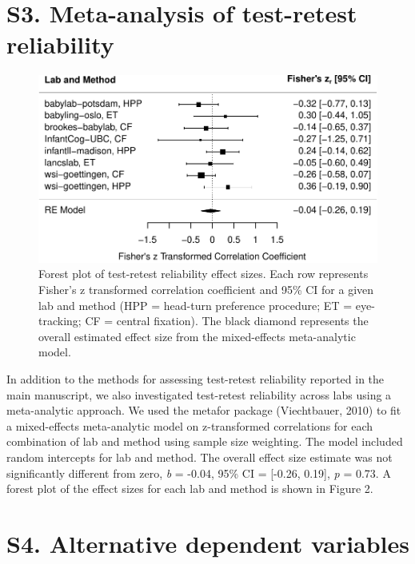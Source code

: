 \documentclass[
  man, donotrepeattitle,floatsintext]{apa6}
\begin{document}
\newpage

\hypertarget{s3.-meta-analysis-of-test-retest-reliability}{%
\section{S3. Meta-analysis of test-retest reliability}\label{s3.-meta-analysis-of-test-retest-reliability}}

\begin{figure}
\centering
\includegraphics{MB1T_supplement_files/figure-latex/fig2-1.pdf}
\caption{\label{fig:fig2}Forest plot of test-retest reliability effect sizes. Each row represents Fisher's z transformed correlation coefficient and 95\% CI for a given lab and method (HPP = head-turn preference procedure; ET = eye-tracking; CF = central fixation). The black diamond represents the overall estimated effect size from the mixed-effects meta-analytic model.}
\end{figure}

In addition to the methods for assessing test-retest reliability reported in the main manuscript, we also investigated test-retest reliability across labs using a meta-analytic approach.
We used the metafor package (Viechtbauer, 2010) to fit a mixed-effects meta-analytic model on z-transformed correlations for each combination of lab and method using sample size weighting.
The model included random intercepts for lab and method.
The overall effect size estimate was not significantly different from zero, \emph{b} = -0.04, 95\% CI = {[}-0.26, 0.19{]}, \emph{p} = 0.73.
A forest plot of the effect sizes for each lab and method is shown in Figure 2.

\newpage

\hypertarget{s4.-alternative-dependent-variables}{%
\section{S4. Alternative dependent variables}\label{s4.-alternative-dependent-variables}}
\end{document}
